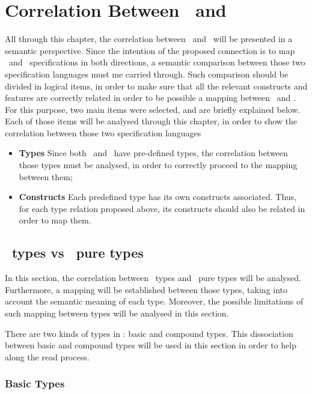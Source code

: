 \chapter{Correlation Between \vpp\ and \jml}
\label{chapter3}

All through this chapter, the correlation between \jml\ and \vpp\ will be presented in a semantic perspective. Since the intention of the proposed connection is to map \vpp\ and \jml\ specifications in both  directions, a semantic comparison between those two specification languages must me carried through. Such comparison should be divided in logical items, in order to make sure that all the relevant constructs and features are correctly related in order to be possible a mapping between \vpp\ and \jml. For this purpose, two main items were selected, and are briefly explained below. Each of those items will be analysed through this chapter, in order to show the correlation between those two specification languages

\begin{itemize}
\item{\textbf{Types}} Since both \jml\ and \vpp\ have pre-defined types, the correlation between those types must be analysed, in order to correctly proceed to the mapping between them; 
\item{\textbf{Constructs}} Each predefined type has its own constructs associated. Thus, for each type relation proposed above, its constructs should also be related in order to map them.
\end{itemize}

\section{\vpp\ types vs \jml\ pure types}
\label{sec:types}

In this section, the correlation between \vpp\ types and \jml\ pure types will be analysed. Furthermore, a mapping will be established between those types, taking into account the semantic meaning of each type. Moreover, the possible limitations of such mapping between types will be analysed in this section.

There are two kinds of types in \vpp : basic and compound types. This dissociation between basic and compound types will be used in this section in order to help along the read process. 

\subsection{Basic Types}

